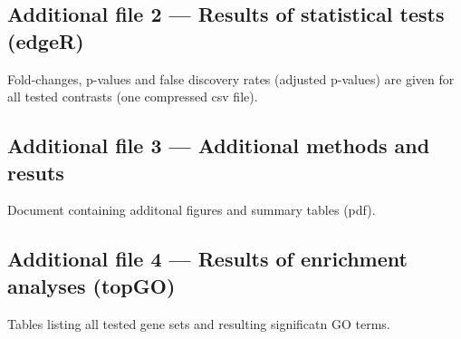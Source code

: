 \documentclass{bmcart}
\begin{document}
\begin{backmatter}
  \subsection*{Additional file 2 --- Results of statistical tests (edgeR) }
  Fold-changes, p-values and false discovery rates (adjusted p-values)
  are given for all tested contrasts (one compressed csv file). 
  
  \subsection*{Additional file 3 --- Additional methods and resuts }
  Document containing additonal figures and summary tables (pdf).

\subsection*{Additional file 4 --- Results of enrichment analyses (topGO)}
  Tables listing all tested gene sets and resulting significatn GO
  terms.
  
  
\end{backmatter}
\end{document}
